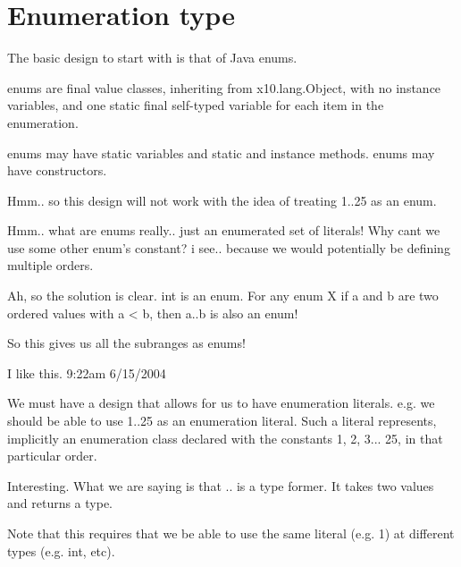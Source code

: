 \section{Enumeration type}


The basic design to start with is that of Java enums.

enums are final value classes, inheriting from x10.lang.Object, with
no instance variables, and one static final self-typed variable for
each item in the enumeration.

enums may have static variables and static and instance methods. enums
may have constructors.


Hmm.. so this design will not work with the idea of treating 1..25 as
an enum.

Hmm.. what are enums really.. just an enumerated set of literals! Why
cant we use some other enum's constant? i see.. because we would potentially be defining multiple orders.

Ah, so the solution is clear. int is an enum. For any enum X if a and
b are two ordered values with a < b, then a..b is also an enum!

So this gives us all the subranges as enums!

I like this. 9:22am 6/15/2004

We must have a design that allows for us to have enumeration literals.
e.g. we should be able to use 1..25 as an enumeration literal. Such a
literal represents, implicitly an enumeration class declared with the
constants 1, 2, 3... 25, in that particular order.

Interesting. What we are saying is that .. is a type former. It takes
two values and returns a type.

Note that this requires that we be able to use the same literal (e.g. 1) at
different types (e.g. int, etc).
